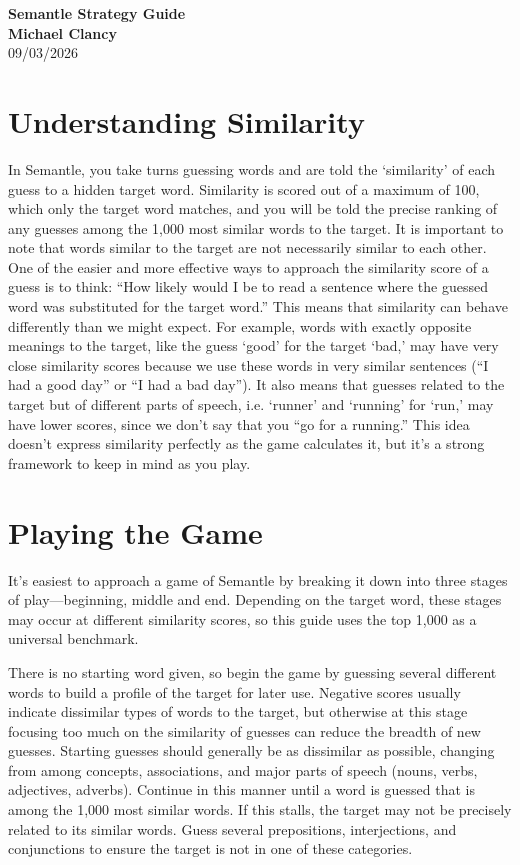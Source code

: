 \documentclass[11pt,letterpaper]{article}
\begin{document}
\begin{center}
    {\Large\bfseries Semantle Strategy Guide}\\[2pt]
    {\bfseries Michael Clancy}\\[8pt]
    { 09/03/2026}
\end{center}

\section*{Understanding Similarity}

In Semantle, you take turns guessing words and are told the `similarity' of each guess to a hidden target word. Similarity is scored out of a maximum of 100, which only the target word matches, and you will be told the precise ranking of any guesses among the 1,000 most similar words to the target. It is important to note that words similar to the target are not necessarily similar to each other. One of the easier and more effective ways to approach the similarity score of a guess is to think: ``How likely would I be to read a sentence where the guessed word was substituted for the target word.'' This means that similarity can behave differently than we might expect. For example, words with exactly opposite meanings to the target, like the guess `good' for the target `bad,' may have very close similarity scores because we use these words in very similar sentences (``I had a good day'' or ``I had a bad day''). It also means that guesses related to the target but of different parts of speech, i.e. `runner' and `running' for `run,' may have lower scores, since we don't say that you ``go for a running.'' This idea doesn't express similarity perfectly as the game calculates it, but it's a strong framework to keep in mind as you play.

\section*{Playing the Game}

It's easiest to approach a game of Semantle by breaking it down into three stages of play---beginning, middle and end. Depending on the target word, these stages may occur at different similarity scores, so this guide uses the top 1,000 as a universal benchmark.

There is no starting word given, so begin the game by guessing several different words to build a profile of the target for later use. Negative scores usually indicate dissimilar types of words to the target, but otherwise at this stage focusing too much on the similarity of guesses can reduce the breadth of new guesses. Starting guesses should generally be as dissimilar as possible, changing from among concepts, associations, and major parts of speech (nouns, verbs, adjectives, adverbs). Continue in this manner until a word is guessed that is among the 1,000 most similar words. If this stalls, the target may not be precisely related to its similar words. Guess several prepositions, interjections, and conjunctions to ensure the target is not in one of these categories.
\end{document}
